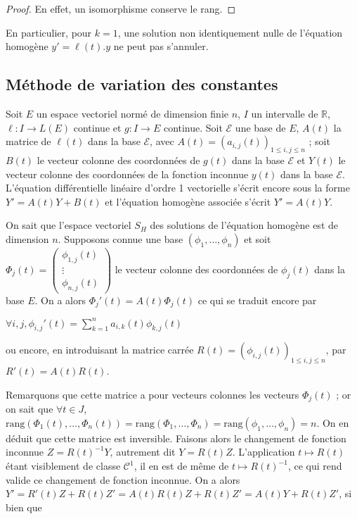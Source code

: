 \begin{proof}
En effet, un isomorphisme conserve le rang.
\end{proof}

\begin{rem}
En particulier, pour $k = 1$, une solution non
identiquement nulle de l'équation homogène $y' = \ell(t).y$ ne peut pas
s'annuler.
\end{rem}

\subsection{Méthode de variation des constantes}

Soit $E$ un espace vectoriel normé de dimension finie $n$, $I$ un intervalle
de $\mathbb{R}$, $\ell : I \rightarrow L(E)$ continue et $g : I \rightarrow E$ continue. Soit $\mathcal{E}$ une base de $E$,
$A(t)$ la matrice de $\ell(t)$ dans la base $\mathcal{E}$, avec $A(t) =
(a_{i,j}(t))_{1 \leq i,j \leq n}$ ; soit $B(t)$ le vecteur colonne des
coordonnées de $g(t)$ dans la base $\mathcal{E}$ et $Y(t)$ le vecteur colonne des
coordonnées de la fonction inconnue $y(t)$ dans la base $\mathcal{E}$. L'équation
différentielle linéaire d'ordre 1 vectorielle s'écrit encore sous la
forme $Y' = A(t)Y + B(t)$ et l'équation homogène associée s'écrit $Y' =
A(t)Y$.

On sait que l'espace vectoriel $S_H$ des solutions de l'équation
homogène est de dimension $n$. Supposons connue une base
$(\phi_1,\ldots,\phi_n)$
et soit $\Phi_j(t) = \begin{pmatrix} \phi_{1,j}(t) \\ \vdots \\ \phi_{n,j}(t) \end{pmatrix}$ le vecteur
colonne des coordonnées de $\phi_j(t)$ dans la base $E$. On a alors
$\Phi_j'(t) = A(t)\Phi_j(t)$ ce qui se traduit encore par

$\forall i,j, \phi_{i,j}'(t) = \sum_{k=1}^n a_{i,k}(t)\phi_{k,j}(t)$

ou encore, en introduisant la matrice carrée $R(t) =
(\phi_{i,j}(t))_{1 \leq i,j \leq n}$, par $R'(t) = A(t)R(t)$.

Remarquons que cette matrice a pour vecteurs colonnes les vecteurs
$\Phi_j(t)$ ; or on sait que $\forall t \in J$,
$\text{rang}(\Phi_1(t),\ldots,\Phi_n(t)) = \text{rang}(\Phi_1,\ldots,\Phi_n) = \text{rang}(\phi_1,\ldots,\phi_n) = n$. On en déduit que cette matrice est inversible. Faisons alors le
changement de fonction inconnue $Z = R(t)^{-1}Y$, autrement dit
$Y = R(t)Z$. L'application $t \mapsto R(t)$ étant
visiblement de classe $\mathcal{C}^1$, il en est de même de
$t \mapsto R(t)^{-1}$, ce qui rend valide ce
changement de fonction inconnue. On a alors $Y' = R'(t)Z + R(t)Z' =
A(t)R(t)Z + R(t)Z' = A(t)Y + R(t)Z'$, si bien que

